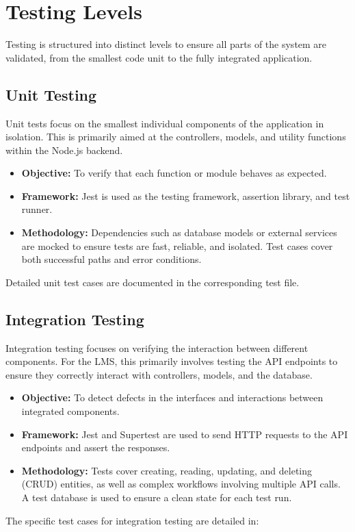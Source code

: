 \section{Testing Levels}
Testing is structured into distinct levels to ensure all parts of the system are validated, from the smallest code unit to the fully integrated application.

\subsection{Unit Testing}
Unit tests focus on the smallest individual components of the application in isolation. This is primarily aimed at the controllers, models, and utility functions within the Node.js backend.
\begin{itemize}
    \item \textbf{Objective:} To verify that each function or module behaves as expected.
    \item \textbf{Framework:} Jest is used as the testing framework, assertion library, and test runner.
    \item \textbf{Methodology:} Dependencies such as database models or external services are mocked to ensure tests are fast, reliable, and isolated. Test cases cover both successful paths and error conditions.
\end{itemize}
Detailed unit test cases are documented in the corresponding test file.


\subsection{Integration Testing}
Integration testing focuses on verifying the interaction between different components. For the LMS, this primarily involves testing the API endpoints to ensure they correctly interact with controllers, models, and the database.
\begin{itemize}
    \item \textbf{Objective:} To detect defects in the interfaces and interactions between integrated components.
    \item \textbf{Framework:} Jest and Supertest are used to send HTTP requests to the API endpoints and assert the responses.
    \item \textbf{Methodology:} Tests cover creating, reading, updating, and deleting (CRUD) entities, as well as complex workflows involving multiple API calls. A test database is used to ensure a clean state for each test run.
\end{itemize}
The specific test cases for integration testing are detailed in:


